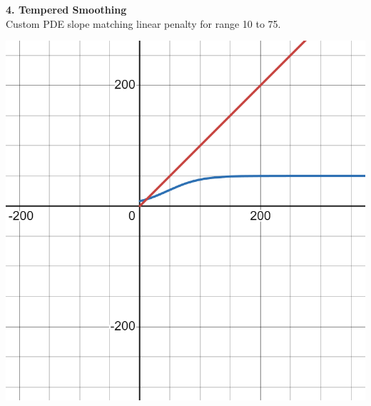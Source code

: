 \documentclass{article}
\begin{document}
  \newpage
  \noindent
  \textbf{4. Tempered Smoothing}\\
  Custom PDE slope matching linear penalty for range 10 to 75.\\
  \begin{center}
    \includegraphics[scale=0.1]{../report_images/tempered_smoothing.png}\\
  \end{center}
\end{document}
